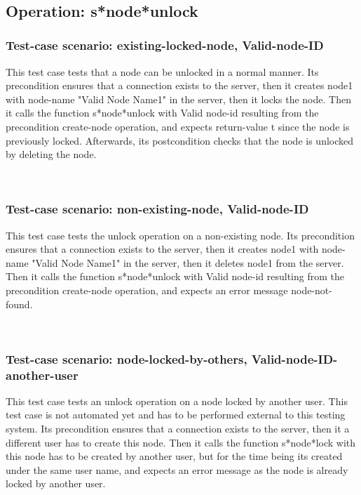 \
\subsection {Operation: s*node*unlock}
\subsubsection {Test-case scenario: existing-locked-node, Valid-node-ID}


This test case tests that a node can be unlocked in a normal manner.
Its precondition ensures that a connection exists to the server, then it creates node1 with node-name "Valid Node Name1" in the server, then it locks the node.
Then it calls the function s*node*unlock  with Valid node-id resulting from the precondition create-node operation, and expects return-value t since the node is previously locked.
Afterwards, its postcondition checks that the node is unlocked by deleting the node.




\
\subsubsection {Test-case scenario: non-existing-node, Valid-node-ID}


This test case tests the unlock operation on a non-existing node.
Its precondition ensures that a connection exists to the server, then it creates node1 with node-name "Valid Node Name1" in the server, then it deletes node1 from the server.
Then it calls the function s*node*unlock  with Valid node-id resulting from the precondition create-node operation, and expects an error message node-not-found.





\
\subsubsection {Test-case scenario: node-locked-by-others, Valid-node-ID-another-user}


This test case tests an unlock operation on a node locked by another user.  This test case is not automated yet and has to be performed external to this testing system.
Its precondition ensures that a connection exists to the server, then it a different user has to create this node.
Then it calls the function s*node*lock  with this node has to be created by another user, but for the time being its created under the same user name, and expects an error message as the node is already locked by another user.



